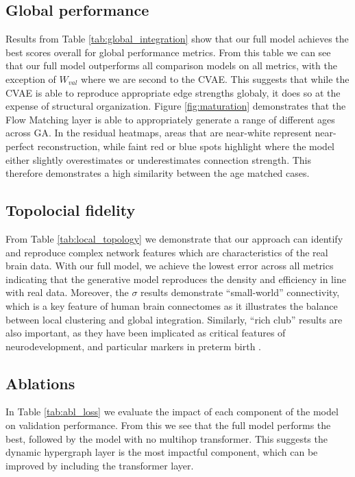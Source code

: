 \documentclass[sigconf, review]{acmart}
\begin{document}
\subsection{Global performance}
Results from Table \ref{tab:global_integration}
show that our full model achieves the best scores overall for global performance metrics. From this table we can see that our full model outperforms all comparison models on all metrics, with the exception of $W_{val}$ where we are second to the CVAE. This suggests that while the CVAE is able to reproduce appropriate edge strengths globaly, it does so at the expense of structural organization. Figure \ref{fig:maturation} demonstrates that the Flow Matching layer is able to appropriately generate a range of different ages across GA. In the residual heatmaps, areas that are near-white represent near-perfect reconstruction, while faint red or blue spots highlight where the model either slightly overestimates or underestimates connection strength. This therefore demonstrates a high similarity between the age matched cases.

\subsection{Topolocial fidelity}
From Table \ref{tab:local_topology} we demonstrate that our approach can identify and reproduce complex network features which are characteristics of the real brain data. With our full model, we achieve the lowest error across all metrics indicating that the generative model reproduces the density and efficiency in line with real data. Moreover, the $\sigma$ results demonstrate ``small-world'' connectivity, which is a key feature of human brain connectomes \cite{humphries2008network} as it illustrates the balance between local clustering and global integration. Similarly, ``rich club'' results are also important, as they have been implicated as critical features of neurodevelopment, and particular markers in preterm birth \cite{bauer2017nonlinear, karolis2016reinforcement}.



\subsection{Ablations}
In Table \ref{tab:abl_loss} we evaluate the impact of each component of the model on validation performance. From this we see that the full model performs the best, followed by the model with no multihop transformer. This suggests the dynamic hypergraph layer is the most impactful component, which can be improved by including the transformer layer.
\end{document}
